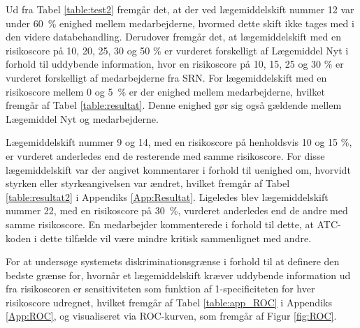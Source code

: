 Ud fra Tabel \ref{table:test2} fremgår det, at der ved lægemiddelskift nummer 12 var under 60~\% enighed mellem medarbejderne, hvormed dette skift ikke tages med i den videre databehandling.  
Derudover fremgår det, at lægemiddelskift med en risikoscore på 10, 20, 25, 30 og 50 \% er vurderet forskelligt af Lægemiddel Nyt i forhold til uddybende information, hvor en risikoscore på 10, 15, 25 og 30 \% er vurderet forskelligt af medarbejderne fra SRN. For lægemiddelskift med en risikoscore mellem 0 og 5~\% er der enighed mellem medarbejderne, hvilket fremgår af Tabel \ref{table:resultat}. Denne enighed gør sig også gældende mellem Lægemiddel Nyt og medarbejderne. 

Lægemiddelskift nummer 9 og 14, med en risikoscore på henholdsvis 10 og 15 \%, er vurderet anderledes end de resterende med samme risikoscore. For disse lægemiddelskift var der angivet kommentarer i forhold til uenighed om, hvorvidt styrken eller styrkeangivelsen var ændret, hvilket fremgår af Tabel \ref{table:resultat2} i Appendiks \ref{App:Resultat}. Ligeledes blev lægemiddelskift nummer 22, med en risikoscore på 30~\%, vurderet anderledes end de andre med samme risikoscore. En medarbejder kommenterede i forhold til dette, at ATC-koden i dette tilfælde vil være mindre kritisk sammenlignet med andre.

For at undersøge systemets diskriminationsgrænse i forhold til at definere den bedste grænse for, hvornår et lægemiddelskift kræver uddybende information ud fra risikoscoren er sensitiviteten som funktion af 1-specificiteten for hver risikoscore udregnet, hvilket fremgår af Tabel \ref{table:app_ROC} i Appendiks \ref{App:ROC}, og visualiseret via ROC-kurven, som fremgår af Figur \ref{fig:ROC}. 

